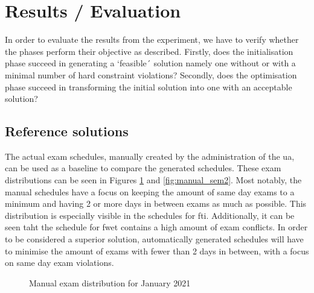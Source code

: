 
\section{Results / Evaluation}\label{sec:results}

In order to evaluate the results from the experiment, we have to verify whether the phases perform their objective as described. Firstly, does the initialisation phase succeed in generating a `feasible´ solution namely one without or with a minimal number of hard constraint violations? Secondly, does the optimisation phase succeed in transforming the initial solution into one with an acceptable solution?

\subsection{Reference solutions}

The actual exam schedules, manually created by the administration of the \acrlong{ua}, can be used as a baseline to compare the generated schedules. These exam distributions can be seen in Figures \ref{fig:manual_sem1} and \ref{fig:manual_sem2}. Most notably, the manual schedules have a focus on keeping the amount of same day exams to a minimum and having 2 or more days in between exams as much as possible. This distribution is especially visible in the schedules for \acrshort{fti}. Additionally, it can be seen taht the schedule for \acrshort{fwet} contains a high amount of exam conflicts. In order to be considered a superior solution, automatically generated schedules will have to minimise the amount of exams with fewer than 2 days in between, with a focus on same day exam violations.

\begin{figure}[H]
  \centering
  \hfill
  \caption{Manual exam distribution for January 2021}
  \label{fig:manual_sem1}
\end{figure}

